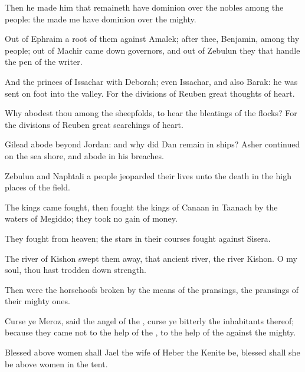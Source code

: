 {Then he made him that
remaineth have
dominion over the
nobles among the
people: the
{} made me have
dominion over the
mighty.

Out of
Ephraim
{} a
root of them against
Amalek;
after thee,
Benjamin, among thy
people; out of
Machir came
down
governors, and out of
Zebulun they that
handle the
pen of the
writer.

And the
princes of
Issachar
{} with
Deborah; even
Issachar, and also
Barak: he was
sent on
foot into the
valley. For the
divisions of
Reuben
{}
great
thoughts of
heart.

Why
abodest thou
among the
sheepfolds, to
hear the
bleatings of the
flocks? For the
divisions of
Reuben
{}
great
searchings of
heart.

Gilead
abode
beyond
Jordan: and why did
Dan
remain in
ships?
Asher
continued on the
sea
shore, and
abode in his
breaches.

Zebulun and
Naphtali
{} a
people
{}
jeoparded their
lives unto the
death in the high
places of the
field.

The
kings
came
{}
fought, then
fought the
kings of
Canaan in
Taanach by the
waters of
Megiddo; they
took no
gain of
money.

They
fought from
heaven; the
stars in their
courses
fought against
Sisera.

The
river of
Kishon swept them
away, that
ancient
river, the
river
Kishon. O my
soul, thou hast trodden
down
strength.

Then were the
horsehoofs
broken by the means of the
pransings, the
pransings of their mighty
ones.

Curse ye
Meroz,
said the
angel of the
{},
curse ye
bitterly the
inhabitants thereof; because they
came not to the
help of the
{}, to the
help of the
{} against the
mighty.


\par }{\PP {}Blessed above
women shall
Jael the
wife of
Heber the
Kenite be,
blessed shall she be above
women in the
tent.

}
